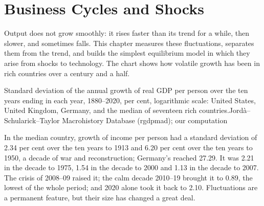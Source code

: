\chapter{Business Cycles and Shocks}\label{ch:b2:business-cycles}

Output does not grow smoothly: it rises faster than its trend for a while, then slower, and sometimes falls. This chapter
measures these fluctuations, separates them from the trend, and builds the simplest equilibrium model in which they arise
from shocks to technology. The chart shows how volatile growth has been in rich countries over a century and a half.

\begin{openingchart}{Standard deviation of the annual growth of real GDP per person over the ten years ending in each year,
  1880--2020, per cent, logarithmic scale: United States, United Kingdom, Germany, and the median of seventeen rich
  countries.}{Jord\`a--Schularick--Taylor Macrohistory Database (rgdpmad); our computation}
\end{openingchart}

In the median country, growth of income per person had a standard deviation of 2.34 per cent over the ten years to 1913 and
6.20 per cent over the ten years to 1950, a decade of war and reconstruction; Germany's reached 27.29. It was 2.21 in the decade to 1975, 1.54 in
the decade to 2000 and 1.13 in the decade to 2007. The crisis of 2008--09 raised it; the calm decade 2010--19 brought it to 0.89, the
lowest of the whole period; and 2020 alone took it back to 2.10.
Fluctuations are a permanent feature, but their size has changed a great deal.

